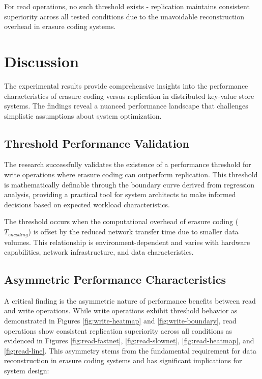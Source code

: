 For read operations, no such threshold exists - replication maintains consistent superiority across all tested conditions due to the unavoidable reconstruction overhead in erasure coding systems.

\section{Discussion}

The experimental results provide comprehensive insights into the performance characteristics of erasure coding versus replication in distributed key-value store systems. The findings reveal a nuanced performance landscape that challenges simplistic assumptions about system optimization.

\subsection{Threshold Performance Validation}

The research successfully validates the existence of a performance threshold for write operations where erasure coding can outperform replication. This threshold is mathematically definable through the boundary curve derived from regression analysis, providing a practical tool for system architects to make informed decisions based on expected workload characteristics.

The threshold occurs when the computational overhead of erasure coding ($T_{encoding}$) is offset by the reduced network transfer time due to smaller data volumes. This relationship is environment-dependent and varies with hardware capabilities, network infrastructure, and data characteristics.

\subsection{Asymmetric Performance Characteristics}

A critical finding is the asymmetric nature of performance benefits between read and write operations. While write operations exhibit threshold behavior as demonstrated in Figures \ref{fig:write-heatmap} and \ref{fig:write-boundary}, read operations show consistent replication superiority across all conditions as evidenced in Figures \ref{fig:read-fastnet}, \ref{fig:read-slownet}, \ref{fig:read-heatmap}, and \ref{fig:read-line}. This asymmetry stems from the fundamental requirement for data reconstruction in erasure coding systems and has significant implications for system design:

